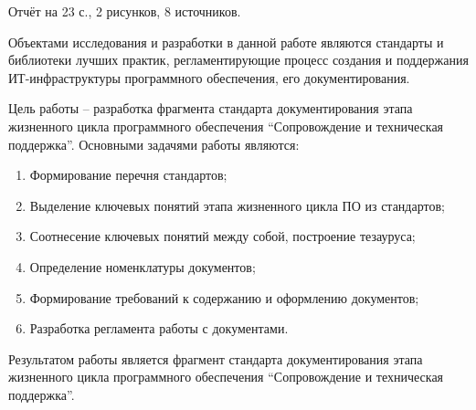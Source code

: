 
\pagebreak
\begin{center}
\end{center}

Отчёт на 23 с., 2 рисунков, 8 источников.


Объектами исследования и разработки в данной работе являются стандарты и библиотеки лучших практик, регламентирующие процесс создания и поддержания ИТ-инфраструктуры программного обеспечения, его документирования.


Цель работы -- разработка фрагмента стандарта документирования этапа жизненного цикла программного обеспечения \enquote{Сопровождение и техническая поддержка}.
Основными задачями работы являются:
\begin{enumerate}
    \item Формирование перечня стандартов;
    \item Выделение ключевых понятий этапа жизненного цикла ПО из стандартов;
    \item Соотнесение ключевых понятий между собой, построение тезауруса;
    \item Определение номенклатуры документов;
    \item Формирование требований к содержанию и оформлению документов;
    \item Разработка регламента работы с документами.
\end{enumerate}

Результатом работы является фрагмент стандарта документирования этапа жизненного цикла программного обеспечения \enquote{Сопровождение и техническая поддержка}.
